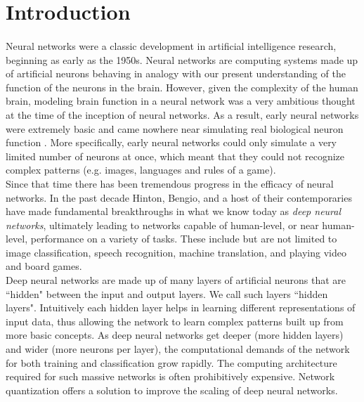 \section{Introduction}
\label{S:1}
\paragraph{}
Neural networks were a classic development in artificial intelligence research, beginning as early as the 1950s. Neural networks are computing systems made up of artificial neurons behaving in analogy with our present understanding of the function of the neurons in the brain. However, given the complexity of the human brain, modeling brain function in a neural network was a very ambitious thought at the time of the inception of neural networks. As a result, early neural networks were extremely basic and came nowhere near simulating real biological neuron function \cite{mcculloch1990logical}. More specifically, early neural networks could only simulate a very limited number of neurons at once, which meant that they could not recognize complex patterns (e.g. images, languages and rules of a game). \\
 
Since that time there has been tremendous progress in the efficacy of neural networks. In the past decade Hinton, Bengio, and a host of their contemporaries have made fundamental breakthroughs\cite{lecun1989backpropagation}\cite{hinton2007learning}\cite{bengio2013estimating}\cite{bengio2014auto}\cite{lee2015difference}\cite{hubara2016quantized} in what we know today as \textit{deep neural networks}, ultimately leading to networks capable of human-level, or near human-level, performance on a variety of tasks. These include but are not limited to image classification\cite{cirecsan2012multi}, speech recognition\cite{deng2014deep}\cite{schmidhuber2015deep}, machine translation\cite{hochreiter1997long}\cite{johnson2016google}, and playing video and board games\cite{justesen2017deep}.\\

Deep neural networks are made up of many layers of artificial neurons that are ``hidden" between the input and output layers. We call such layers ``hidden layers". Intuitively each hidden layer helps in learning different representations of input data, thus allowing the network to learn complex patterns built up from more basic concepts. As deep neural networks get deeper (more hidden layers) and wider (more neurons per layer), the computational demands of the network for both training and classification grow rapidly. The computing architecture required for such massive networks is often prohibitively expensive. Network quantization offers a solution to improve the scaling of deep neural networks\cite{hubara2016quantized}. \\


